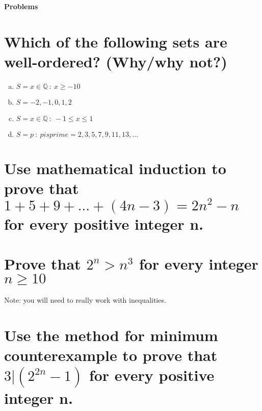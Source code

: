 \textbf{\Huge Problems}
\section{Which of the following sets are well-ordered? (Why/why not?)}
\begin{enumerate}[a.]
\item $S={x\in\mathbb{Q}\ :\ x\geq-10}$
\item $S={-2,-1,0,1,2}$
\item $S={x\in\mathbb{Q}\ :\ -1\leq x\leq 1}$
\item $S={p\ : \ p is prime} = {2,3,5,7,9,11,13,...}$
\end{enumerate}


\section{Use mathematical induction to prove that $1+5+9+...+(4n-3)=2n^2-n$ for every positive integer n.}


\section{Prove that $2^n>n^3$ for every integer $n\geq 10$}
Note: you will need to really work with inequalities.


\section{Use the method for minimum counterexample to prove that $3|(2^{2n}-1)$ for every positive integer n.}


